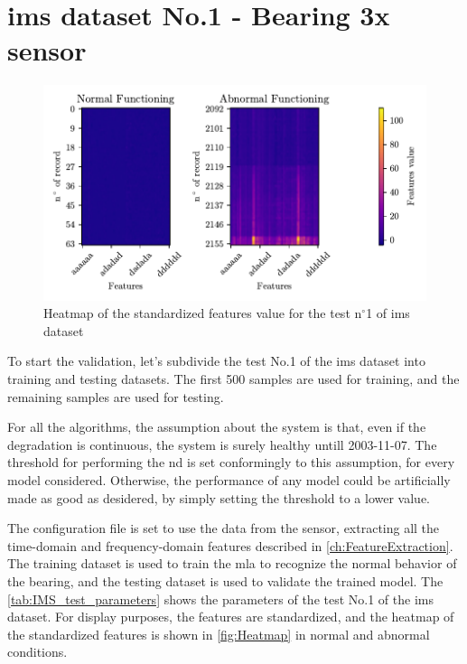 \section{\gls{ims} dataset No.1 - Bearing 3x sensor}
\label{sec:ValidationOnRealWorldData}
\begin{figure}
    \centering
    \includegraphics{images/IMS/Heatmap.pdf}
    \caption{Heatmap of the standardized features value for the test $\text{n}^\circ$1 of \gls{ims} dataset}
    \label{fig:Heatmap}
\end{figure}


To start the validation, let's subdivide the test No.1 of the \gls{ims} dataset into training and testing datasets. The first 500 samples are used for training, and the remaining samples are used for testing. 

For all the algorithms, the assumption about the system is that, even if the degradation is continuous, the system is surely healthy untill 2003-11-07. The threshold for performing the \gls{nd} is set conformingly to this assumption, for every model considered. Otherwise, the performance of any model could be artificially made as good as desidered, by simply setting the threshold to a lower value.

The configuration file is set to use the data from the  sensor, extracting all the time-domain and frequency-domain features described in \autoref{ch:FeatureExtraction}. The training dataset is used to train the \gls{mla} to recognize the normal behavior of the bearing, and the testing dataset is used to validate the trained model. The \autoref{tab:IMS_test_parameters} shows the parameters of the test No.1 of the \gls{ims} dataset. For display purposes, the features are standardized, and the heatmap of the standardized features is shown in \autoref{fig:Heatmap} in normal and abnormal conditions.

